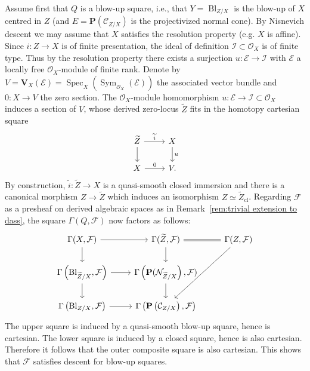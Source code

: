 \documentclass[11pt]{article}
\theoremstyle{definition}
\numberwithin{equation}{section}
\numberwithin{figure}{section}
\numberwithin{table}{section}
\newcommand{\sC}{\ensuremath{\mathcal{C}}\xspace}
\newcommand{\sE}{\ensuremath{\mathcal{E}}\xspace}
\newcommand{\sF}{\ensuremath{\mathcal{F}}\xspace}
\newcommand{\sI}{\ensuremath{\mathcal{I}}\xspace}
\newcommand{\sN}{\ensuremath{\mathcal{N}}\xspace}
\newcommand{\sO}{\ensuremath{\mathcal{O}}\xspace}
\newcommand{\bP}{\ensuremath{\mathbf{P}}\xspace}
\newcommand{\bV}{\ensuremath{\mathbf{V}}\xspace}
\newcommand{\cl}{{\mrm{cl}}}
\renewcommand{\P}{\bP}
\DeclareMathOperator{\Sym}{Sym}
\DeclareMathOperator{\Spec}{Spec}
\DeclareMathOperator{\Bl}{Bl}
\newcommand{\mrm}[1]{\ensuremath{\mathrm{#1}}\xspace}
\begin{document}
\subsubsection{}\label{sssec:cdh criterion proof/blow-up}

Assume first that $Q$ is a blow-up square, i.e., that $Y = \Bl_{Z/X}$ is the blow-up of $X$ centred in $Z$ (and $E = \P(\sC_{Z/X})$ is the projectivized normal cone). By Nisnevich descent we may assume that $X$ satisfies the resolution property (e.g. $X$ is affine). Since $i : Z \to X$ is of finite presentation, the ideal of definition $\sI \subset \sO_X$ is of finite type. Thus by the resolution property there exists a surjection $u : \sE \to \sI$ with $\sE$ a locally free $\sO_X$-module of finite rank. Denote by $V = \bV_X(\sE) = \Spec_X(\Sym_{\sO_X}(\sE))$ the associated vector bundle and $0 : X \to V$ the zero section. The $\sO_X$-module homomorphism $u : \sE \to \sI \subset \sO_X$ induces a section of $V$, whose derived zero-locus $\widetilde{Z}$ fits in the homotopy cartesian square
\[
\begin{tikzcd}
\widetilde{Z} \ar{r}{\widetilde{i}}\ar{d} & X \ar{d}{u}
\\
X \ar{r}{0} & V.
\end{tikzcd}
\]
By construction, $\widetilde{i} : \widetilde{Z} \to X$ is a quasi-smooth closed immersion and there is a canonical morphism $Z \to \widetilde{Z}$ which induces an isomorphism $Z \simeq \widetilde{Z}_\cl$. Regarding $\sF$ as a presheaf on derived algebraic spaces as in Remark~\ref{rem:trivial extension to dass}, the square $\Gamma(Q,\sF)$ now factors as follows:
\[
\begin{tikzcd}
\Gamma(X, \sF) \ar{r}\ar{d} & \Gamma(\widetilde{Z}, \sF) \ar{d}\ar[equals]{r} & \Gamma(Z, \sF) \ar{ldd}
\\
\Gamma\left(\Bl_{\widetilde{Z}/X}, \sF\right) \ar{r}\ar{d} & \Gamma\left(\P(\sN_{\widetilde{Z}/X}\right), \sF) \ar{d}
\\
\Gamma\left(\Bl_{Z/X}, \sF\right) \ar{r} & \Gamma\left(\P\left(\sC_{Z/X}\right), \sF\right)
\end{tikzcd}
\]
The upper square is induced by a quasi-smooth blow-up square, hence is cartesian. The lower square is induced by a closed square, hence is also cartesian. Therefore it follows that the outer composite square is also cartesian. This shows that $\sF$ satisfies descent for blow-up squares.

\subsubsection{}\label{sssec:cdh criterion proof/blow-up (X-Z)-admissible}
\end{document}
